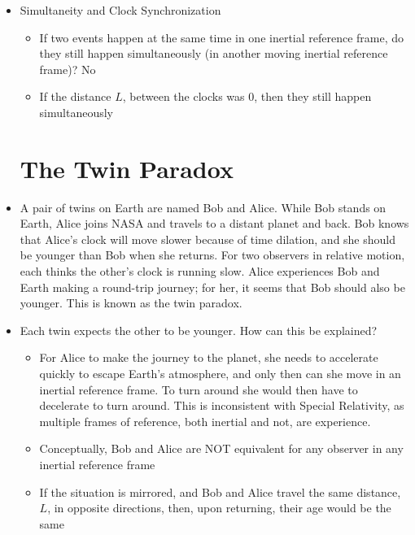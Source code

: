 \begin{itemize}
\begin{itemize}
          \end{itemize}

        \item Simultaneity and Clock Synchronization

          \begin{itemize}

            \item If two events happen at the same time in one inertial reference frame, do they still happen simultaneously (in another moving inertial reference frame)? No

            \item If the distance $L$, between the clocks was 0, then they still happen simultaneously

          \end{itemize}

    \section{The Twin Paradox}

  \item A pair of twins on Earth are named Bob and Alice. While Bob stands on Earth, Alice joins NASA and travels to a distant planet and back. Bob knows that Alice's clock will move slower because of time dilation, and she should be younger than Bob when she returns. For two observers in relative motion, each thinks the other's clock is running slow. Alice experiences Bob and Earth making a round-trip journey; for her, it seems that Bob should also be younger. This is known as the twin paradox.

  \item Each twin expects the other to be younger. How can this be explained?

    \begin{itemize}

      \item For Alice to make the journey to the planet, she needs to accelerate quickly to escape Earth's atmosphere, and only then can she move in an inertial reference frame. To turn around she would then have to decelerate to turn around. This is inconsistent with Special Relativity, as multiple frames of reference, both inertial and not, are experience.

      \item Conceptually, Bob and Alice are NOT equivalent for any observer in any inertial reference frame

      \item If the situation is mirrored, and Bob and Alice travel the same distance, $L$, in opposite directions, then, upon returning, their age would be the same


\end{itemize}
\end{itemize}

